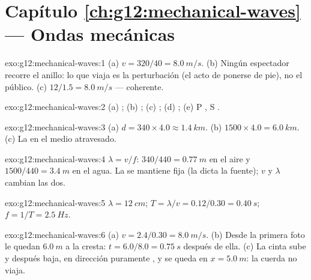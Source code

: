 \section*{Capítulo \ref{ch:g12:mechanical-waves} --- Ondas mecánicas}

\begin{solution}{exo:g12:mechanical-waves:1}
(a) $v = 320/40 = \qty{8.0}{m/s}$. (b) Ningún espectador recorre el
anillo: lo que viaja es la perturbación (el acto de ponerse de pie), no
el público. (c) $12/1.5 = \qty{8.0}{m/s}$ --- coherente.
\end{solution}

\begin{solution}{exo:g12:mechanical-waves:2}
(a) ; (b) ; (c) ; (d) ;
(e) P , S .
\end{solution}

\begin{solution}{exo:g12:mechanical-waves:3}
(a) $d = 340 \times 4.0 \approx \qty{1.4}{km}$.
(b) $1500 \times 4.0 = \qty{6.0}{km}$. (c) La 
en el medio atravesado.
\end{solution}

\begin{solution}{exo:g12:mechanical-waves:4}
$\lambda = v/f$: $340/440 = \qty{0.77}{m}$ en el aire y
$1500/440 = \qty{3.4}{m}$ en el agua. La  se mantiene fija (la
dicta la fuente); $v$ y $\lambda$ cambian las dos.
\end{solution}

\begin{solution}{exo:g12:mechanical-waves:5}
$\lambda = \qty{12}{cm}$; $T = \lambda/v = 0.12/0.30 = \qty{0.40}{s}$;
$f = 1/T = \qty{2.5}{Hz}$.
\end{solution}

\begin{solution}{exo:g12:mechanical-waves:6}
(a) $v = 2.4/0.30 = \qty{8.0}{m/s}$. (b) Desde la primera foto le quedan
$\qty{6.0}{m}$ a la cresta: $t = 6.0/8.0 = \qty{0.75}{s}$ después de
ella. (c) La cinta sube y después baja, en dirección puramente
, y se queda en $x = \qty{5.0}{m}$: la cuerda no viaja.
\end{solution}

